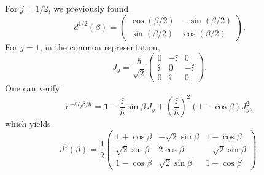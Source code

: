 For $j=1/2$, we previously found
\begin{equation}
d^{1/2}(\beta)=\begin{pmatrix}\cos(\beta/2)&-\sin(\beta/2)\\\sin(\beta/2)&\cos(\beta/2)\end{pmatrix}.
\end{equation}
For $j=1$, in the common representation,
\begin{equation}
J_y=\frac\hbar{\sqrt2}\begin{pmatrix}0&-\ii&0\\\ii&0&-\ii\\0&\ii&0\end{pmatrix}.
\end{equation}
One can verify
\begin{equation}
e^{-\ii J_y\beta/\hbar}
=\mathbf1-\frac\ii\hbar\sin\beta\,J_y
+\left(\frac\ii\hbar\right)^2(1-\cos\beta)J_y^2,
\end{equation}
which yields
\begin{equation}
\boxed{d^1(\beta)=\frac12\begin{pmatrix}
1+\cos\beta&-\sqrt2\sin\beta&1-\cos\beta\\
\sqrt2\sin\beta&2\cos\beta&-\sqrt2\sin\beta\\
1-\cos\beta&\sqrt2\sin\beta&1+\cos\beta
\end{pmatrix}.}
\end{equation}